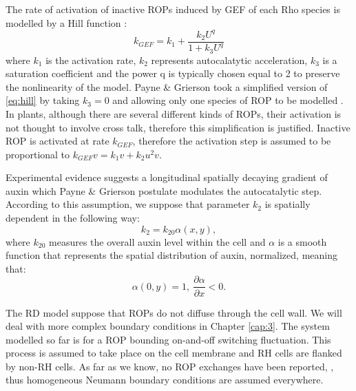 The rate of activation of inactive ROPs induced by GEF of each Rho species is modelled by a Hill function \cite{phd:67_hill}:
\begin{equation}\label{eq:hill}
    k_{GEF} = k_1 + \frac{k_2 U^q}{1+k_3 U ^q}
\end{equation}
where $k_1$ is the activation rate, $k_2$ represents autocalatytic acceleration, $k_3$ is a saturation coefficient and the power q is typically chosen equal to 2 to preserve the nonlinearity of the model. Payne \& Grierson \cite{payne} took a simplified version of \eqref{eq:hill} by taking $k_3 = 0$ and allowing only one species of ROP to be modelled \cite{phd:67_hill}. In plants, although there are several different kinds of ROPs, their activation is not thought to involve cross talk, therefore this simplification is justified. Inactive ROP is activated at rate $k_{GEF}$, therefore the activation step is assumed to be proportional to $k_{GEF} v = k_1 v + k_2 u^2 v$.

Experimental evidence suggests a longitudinal spatially decaying gradient of auxin which Payne \& Grierson postulate modulates the autocatalytic step. According to this assumption, we suppose that parameter $k_2$ is spatially dependent in the following way:
\begin{equation}
    k_2 = k_{20} \alpha \left(x, y\right),
\end{equation}
where $k_{20}$ measures the overall auxin level within the cell and $\alpha$ is a smooth function that represents the spatial distribution of auxin, normalized, meaning that:
\begin{equation}\label{eq:jones auxina}
    \alpha(0,y) = 1, \ \frac{\partial \alpha}{\partial x} < 0.
\end{equation}

The RD model suppose that ROPs do not diffuse through the cell wall. We will deal with more complex boundary conditions in Chapter \ref{cap:3}. The system modelled so far is for a ROP bounding on-and-off switching fluctuation. This process is assumed to take place on the cell membrane and RH cells are flanked by non-RH cells. As far as we know, no ROP exchanges have been reported,  \cite{intra1_R:Arabook}, thus homogeneous Neumann boundary conditions are assumed everywhere.

